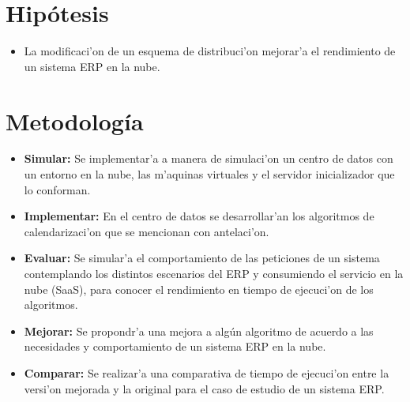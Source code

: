 
\chapter*{Hip\'otesis}


\begin{itemize}
\item La modificaci'on de un esquema de distribuci'on mejorar'a el rendimiento de un sistema ERP en la nube.
\end{itemize}


\chapter*{Metodolog\'ia}

\begin{itemize}
\item \textbf{Simular:} Se implementar'a a manera de simulaci'on un centro de datos con un entorno en la nube, las m'aquinas virtuales y el servidor inicializador que lo conforman.
\item \textbf{Implementar:} En el centro de datos se desarrollar'an los algoritmos de calendarizaci'on que se mencionan con antelaci'on.
\item \textbf{Evaluar:} Se simular'a el comportamiento de las peticiones de un sistema contemplando los distintos escenarios del ERP y consumiendo el servicio en la nube (SaaS), para conocer el rendimiento en tiempo de ejecuci'on de los algoritmos.
\item \textbf{Mejorar:} Se propondr'a una mejora a algún algoritmo de acuerdo a las necesidades y comportamiento de un sistema ERP en la nube.
\item \textbf{Comparar:} Se realizar'a una comparativa de tiempo de ejecuci'on entre la versi'on mejorada y la original para el caso de estudio de un sistema ERP.
\end{itemize}